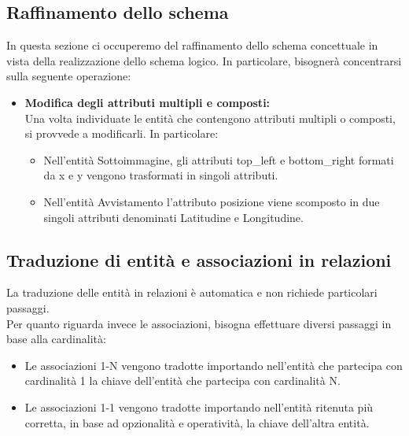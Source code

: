 \documentclass[a4paper,final,12pt]{report}
\begin{document}
\subsection{Raffinamento dello schema}
In questa sezione ci occuperemo del raffinamento dello schema concettuale in vista della realizzazione dello schema logico. In particolare, bisognerà concentrarsi sulla seguente operazione:

\begin{itemize}
\item \textbf{Modifica degli attributi multipli e composti:}\\
Una volta individuate le entità che contengono attributi multipli o composti, si provvede a modificarli. In particolare: \\ 
\begin{itemize}
\item Nell'entità Sottoimmagine, gli attributi top\_left e bottom\_right formati da x e y vengono trasformati in singoli attributi.
\item Nell'entità Avvistamento l'attributo posizione viene scomposto in due singoli attributi denominati Latitudine e Longitudine. 
\end{itemize}
\end{itemize}

\subsection{Traduzione di entità e associazioni in relazioni}
La traduzione delle entità in relazioni è automatica e non richiede particolari passaggi.\\
Per quanto riguarda invece le associazioni, bisogna effettuare diversi passaggi in base alla cardinalità:
\begin{itemize}
\item  Le associazioni 1-N vengono tradotte importando nell'entità che partecipa con cardinalità 1 la chiave dell'entità che partecipa con cardinalità N.
\item Le associazioni 1-1 vengono tradotte importando nell'entità ritenuta più corretta, in base ad opzionalità e operatività, la chiave dell'altra entità.
\end{itemize}
\end{document}
